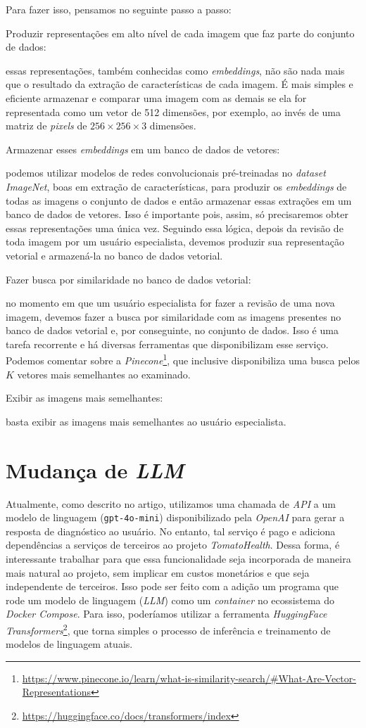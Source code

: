 Para fazer isso, pensamos no seguinte passo a passo:
\begin{enumerate}
    {\bf  \item Produzir representações em alto nível de cada imagem que faz parte do conjunto de dados:} essas representações, também conhecidas como \emph{embeddings}, não são nada mais que o resultado da extração de características de cada imagem. É mais simples e eficiente armazenar e comparar uma imagem com as demais se ela for representada como um vetor de 512 dimensões, por exemplo, ao invés de uma matriz de \emph{pixels} de $256 \times 256 \times 3$ dimensões.
    {\bf \item Armazenar esses \emph{embeddings} em um banco de dados de vetores:} podemos utilizar modelos de redes convolucionais pré-treinadas no \emph{dataset ImageNet}, boas em extração de características, para produzir os \emph{embeddings} de todas as imagens o conjunto de dados e então armazenar essas extrações em um banco de dados de vetores. Isso é importante pois, assim, só precisaremos obter essas representações uma única vez. Seguindo essa lógica, depois da revisão de toda imagem por um usuário especialista, devemos produzir sua representação vetorial e armazená-la no banco de dados vetorial.
    {\bf \item Fazer busca por similaridade no banco de dados vetorial:} no momento em que um usuário especialista for fazer a revisão de uma nova imagem, devemos fazer a busca por similaridade com as imagens presentes no banco de dados vetorial e, por conseguinte, no conjunto de dados. Isso é uma tarefa recorrente e há diversas ferramentas que disponibilizam esse serviço. Podemos comentar sobre a \emph{Pinecone}\footnote{\url{https://www.pinecone.io/learn/what-is-similarity-search/\#What-Are-Vector-Representations}}, que inclusive disponibiliza uma busca pelos $K$ vetores mais semelhantes ao examinado.
     {\bf \item Exibir as imagens mais semelhantes:} basta exibir as imagens mais semelhantes ao usuário especialista.
\end{enumerate}

\section{Mudança de \emph{LLM}}

Atualmente, como descrito no artigo, utilizamos uma chamada de \textit{API} a um modelo de linguagem (\texttt{gpt-4o-mini}) disponibilizado pela \textit{OpenAI} para gerar a resposta de diagnóstico ao usuário. No entanto, tal serviço é pago e adiciona dependências a serviços de terceiros ao projeto \emph{TomatoHealth}. Dessa forma, é interessante trabalhar para que essa funcionalidade seja incorporada de maneira mais natural ao projeto, sem implicar em custos monetários e que seja independente de terceiros. Isso pode ser feito com a adição um programa que rode um modelo de linguagem (\emph{LLM}) como um \emph{container} no ecossistema do \emph{Docker Compose}. Para isso, poderíamos utilizar a ferramenta \emph{HuggingFace Transformers}\footnote{\url{https://huggingface.co/docs/transformers/index}}, que torna simples o processo de inferência e treinamento de modelos de linguagem atuais.
